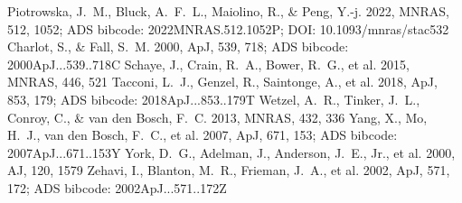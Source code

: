 \documentclass[twocolumn]{aastex631}
\begin{document}
\begin{thebibliography}{}
 Piotrowska, J.~M., Bluck, A.~F.~L., Maiolino, R., \& Peng, Y.-j. 2022, MNRAS, 512, 1052; ADS bibcode: 2022MNRAS.512.1052P; DOI: 10.1093/mnras/stac532
 Charlot, S., \& Fall, S.~M. 2000, ApJ, 539, 718; ADS bibcode: 2000ApJ...539..718C
 Schaye, J., Crain, R.~A., Bower, R.~G., et al. 2015, MNRAS, 446, 521
 Tacconi, L.~J., Genzel, R., Saintonge, A., et al. 2018, ApJ, 853, 179; ADS bibcode: 2018ApJ...853..179T
 Wetzel, A.~R., Tinker, J.~L., Conroy, C., \& van den Bosch, F.~C. 2013, MNRAS, 432, 336
 Yang, X., Mo, H.~J., van den Bosch, F.~C., et al. 2007, ApJ, 671, 153; ADS bibcode: 2007ApJ...671..153Y
 York, D.~G., Adelman, J., Anderson, J.~E., Jr., et al. 2000, AJ, 120, 1579
 Zehavi, I., Blanton, M.~R., Frieman, J.~A., et al. 2002, ApJ, 571, 172; ADS bibcode: 2002ApJ...571..172Z
\end{thebibliography}
\end{document}
